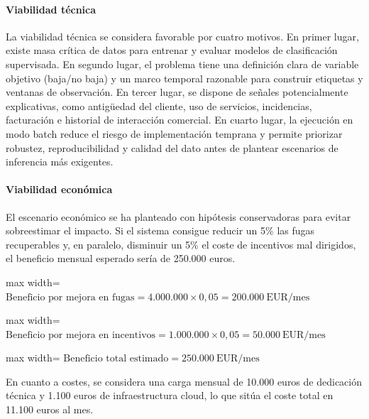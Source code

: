 \documentclass[12pt,a4paper]{article}
\begin{document}
\paragraph{Viabilidad técnica}

La viabilidad técnica se considera favorable por cuatro motivos. En primer lugar, existe masa crítica de datos para entrenar y evaluar modelos de clasificación supervisada. En segundo lugar, el problema tiene una definición clara de variable objetivo (baja/no baja) y un marco temporal razonable para construir etiquetas y ventanas de observación. En tercer lugar, se dispone de señales potencialmente explicativas, como antigüedad del cliente, uso de servicios, incidencias, facturación e historial de interacción comercial. En cuarto lugar, la ejecución en modo batch reduce el riesgo de implementación temprana y permite priorizar robustez, reproducibilidad y calidad del dato antes de plantear escenarios de inferencia más exigentes.\par

\paragraph{Viabilidad económica}

El escenario económico se ha planteado con hipótesis conservadoras para evitar sobreestimar el impacto. Si el sistema consigue reducir un 5\% las fugas recuperables y, en paralelo, disminuir un 5\% el coste de incentivos mal dirigidos, el beneficio mensual esperado sería de 250.000 euros.\par

\begin{adjustbox}{max width=\textwidth}
$\displaystyle \text{Beneficio por mejora en fugas} = 4.000.000 \times 0{,}05 = 200.000\ \text{EUR/mes}$
\end{adjustbox}

\begin{adjustbox}{max width=\textwidth}
$\displaystyle \text{Beneficio por mejora en incentivos} = 1.000.000 \times 0{,}05 = 50.000\ \text{EUR/mes}$
\end{adjustbox}

\begin{adjustbox}{max width=\textwidth}
$\displaystyle \text{Beneficio total estimado} = 250.000\ \text{EUR/mes}$
\end{adjustbox}

En cuanto a costes, se considera una carga mensual de 10.000 euros de dedicación técnica y 1.100 euros de infraestructura cloud, lo que sitúa el coste total en 11.100 euros al mes.\par
\end{document}
